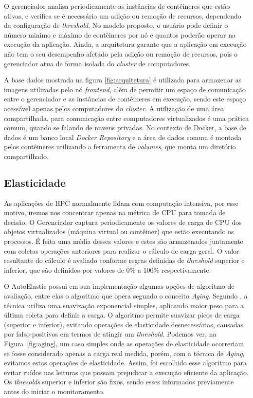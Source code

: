 \documentclass[twoside,english,brazilian]{UNISINOSartigo}
\begin{document}
O gerenciador analisa periodicamente as instâncias de contêineres que estão ativas, e verifica se é necessário um adição ou remoção de recursos, dependendo da configuração de \textit{threshold}. No modelo proposto, o usuário pode definir o número minimo e máximo de contêineres por nó e quantos poderão operar na execução da aplicação. Ainda, a arquitetura garante que a aplicação em execução não tem o seu desempenho afetado pela adição ou remoção de recursos, pois o gerenciador atua de forma isolada do \textit{cluster} de computadores. 

A base dados mostrada na figura \ref{fig:arquitetura} é utilizada para armazenar as imagens utilizadas pelo nó \textit{frontend}, além de permitir um espaço de comunicação entre o gerenciador e as instâncias de contêineres em execução, sendo este espaço acessável apenas pelos computadores do \textit{cluster}. A utilização de uma área compartilhada, para comunicação entre computadores virtualizados é uma prática comum, quando se falando de nuvens privadas. No contexto de Docker, a base de dados é um banco local \textit{Docker Repository} e a área de dados comum é montada pelos contêineres utilizando a ferramenta de \textit{volumes}, que monta um diretório compartilhado.

\subsection{Elasticidade}
As aplicações de HPC normalmente lidam com computação intensiva, por esse motivo, iremos nos concentrar apenas na métrica de CPU para tomada de decisão. O Gerenciador captura periodicamente os valores de carga de CPU dos objetos virtualizados (máquina virtual ou contêiner) que estão executando os processos. É feita uma média desses valores e estes são armazenados juntamente com coletas operações anteriores para realizar o cálculo de carga geral. O valor resultante do cálculo é avaliado conforme regras definidas de \textit{threshold} superior e inferior, que são definidos por valores de 0\% a 100\% respectivamente. 


O AutoElastic possui em sua implementação algumas opções de algoritmo de avaliação, entre elas o algoritmo que opera segundo o conceito \textit{Aging}. Segundo , a técnica utiliza uma suavização exponencial simples, aplicando maior peso para a última coleta para definir a carga. O algoritmo permite suavizar picos de carga (superior e inferior), evitando operações de elasticidade desnecessárias, causadas por falso-positivos em termos de atingir um \textit{threshold}. Podemos ver, na Figura~\ref{fig:aging}, um caso simples onde as operações de elasticidade ocorreriam se fosse considerado apenas a carga real medida, porém, com a técnica de \textit{Aging}, evitamos estas operações de elasticidade. Assim, foi escolhido esse algoritmo para evitar ruídos nas leituras que possam prejudicar a execução eficiente da aplicação. Os \textit{thresolds} superior e inferior são fixos, sendo esses informados previamente antes do iniciar o monitoramento.
\end{document}
